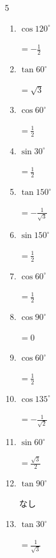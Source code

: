 \begin{multicols}{5}
\begin{enumerate}
  \item $\displaystyle \cos{120^\circ}$

        $\displaystyle =-\frac{1}{2}$

  \item $\displaystyle \tan{60^\circ}$

        $\displaystyle =\sqrt{3}$

  \item $\displaystyle \cos{60^\circ}$

        $\displaystyle =\frac{1}{2}$

  \item $\displaystyle \sin{30^\circ}$

        $\displaystyle =\frac{1}{2}$

  \item $\displaystyle \tan{150^\circ}$

        $\displaystyle =-\frac{1}{\sqrt{3}}$

  \item $\displaystyle \sin{150^\circ}$

        $\displaystyle =\frac{1}{2}$

  \item $\displaystyle \cos{60^\circ}$

        $\displaystyle =\frac{1}{2}$

\columnbreak %

  \item $\displaystyle \cos{90^\circ}$

        $\displaystyle =0$

  \item $\displaystyle \cos{60^\circ}$

        $\displaystyle =\frac{1}{2}$

  \item $\displaystyle \cos{135^\circ}$

        $\displaystyle =-\frac{1}{\sqrt{2}}$

  \item $\displaystyle \sin{60^\circ}$

        $\displaystyle =\frac{\sqrt{3}}{2}$

  \item $\displaystyle \tan{90^\circ}$

        $\displaystyle なし$

  \item $\displaystyle \tan{30^\circ}$

        $\displaystyle =\frac{1}{\sqrt{3}}$


\end{enumerate}
\end{multicols}
